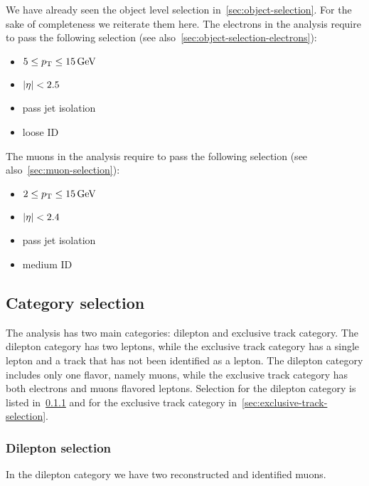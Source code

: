 We have already seen the object level selection in~\ref{sec:object-selection}. For the sake of completeness we reiterate them here. The electrons in the analysis require to pass the following selection (see also~\ref{sec:object-selection-electrons}):

\begin{itemize}

\item $5 \leq p_{\mathrm{T}} \leq 15\,\text{Ge\hspace{-.08em}V}$
\item $\lvert \eta \rvert < 2.5$
\item pass jet isolation
\item loose ID

\end{itemize}

The muons in the analysis require to pass the following selection (see also~\ref{sec:muon-selection}):

\begin{itemize}

\item $2 \leq p_{\mathrm{T}} \leq 15\,\text{Ge\hspace{-.08em}V}$
\item $\lvert \eta \rvert < 2.4$
\item pass jet isolation
\item medium ID

\end{itemize}

\subsection{Category selection}
\label{sec:category-selection}

The analysis has two main categories: dilepton and exclusive track category. The dilepton category has two leptons, while the exclusive track category has a single lepton and a track that has not been identified as a lepton. The dilepton category includes only one flavor, namely muons, while the exclusive track category has both electrons and muons flavored leptons. Selection for the dilepton category is listed in~\ref{sec:dilepton-selection} and for the exclusive track category in~\ref{sec:exclusive-track-selection}.

\subsubsection{Dilepton selection}
\label{sec:dilepton-selection}

In the dilepton category we have two reconstructed and identified muons.

